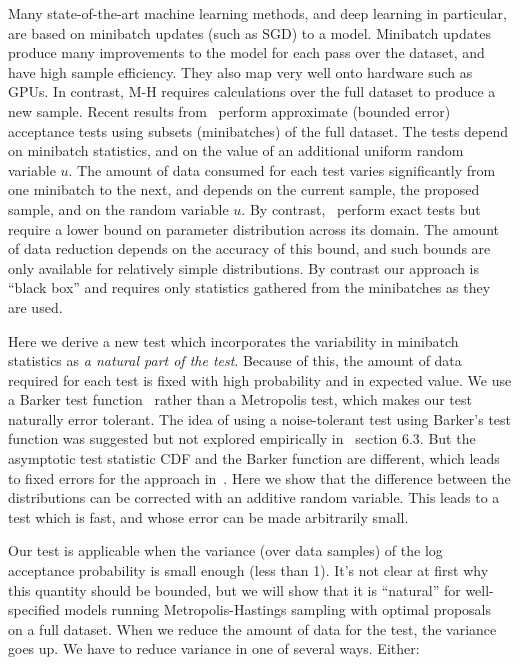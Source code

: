 \documentclass{article}
\begin{document}
Many state-of-the-art machine learning methods, and deep learning in
particular, are based on minibatch updates (such as SGD) to a model.
Minibatch updates produce many improvements to the model for each pass
over the dataset, and have high sample efficiency. They also map very
well onto hardware such as GPUs. In contrast, M-H requires
calculations over the full dataset to produce a new sample.  Recent
results from~\cite{cutting_mh_2014,icml2014c1_bardenet14} perform
approximate (bounded error) acceptance tests using subsets
(minibatches) of the full dataset. The tests depend on minibatch
statistics, and on the value of an additional uniform random variable
$u$. The amount of data consumed for each test varies significantly
from one minibatch to the next, and depends on the current sample, the
proposed sample, and on the random variable $u$. By
contrast,~\cite{conf/uai/MaclaurinA14}\cite{TallData15} perform exact
tests but require a lower bound on parameter distribution across its
domain.  The amount of data reduction depends on the accuracy of this
bound, and such bounds are only available for relatively simple
distributions. By contrast our approach is ``black box'' and requires
only statistics gathered from the minibatches as they are used. 

Here we derive a new test which incorporates the variability in minibatch
statistics as {\em a natural part of the test}. Because of this, the amount of
data required for each test is fixed with high probability and in expected
value.
We use a Barker test function~\cite{Barker65} rather than a Metropolis
test, which makes our test naturally error tolerant. The idea of using
a noise-tolerant test using Barker's test function was suggested but
not explored empirically in~\cite{Bardenet15} section 6.3. But the
asymptotic test statistic CDF and the Barker function are different,
which leads to fixed errors for the approach
in~\cite{Bardenet15}. Here we show that the difference between the
distributions can be corrected with an additive random variable. This
leads to a test which is fast, and whose error can be made arbitrarily
small.

Our test is applicable when the variance (over data samples) of the log
acceptance probability is small enough (less than 1). It's not clear at first why
this quantity should be bounded, but we will show that it is ``natural'' for
well-specified models running Metropolis-Hastings sampling with optimal
proposals~\cite{OptimalScaling01} on a full dataset. When we reduce the amount
of data for the test, the variance goes up. We have to reduce variance in one
of several ways. Either:
\end{document}
